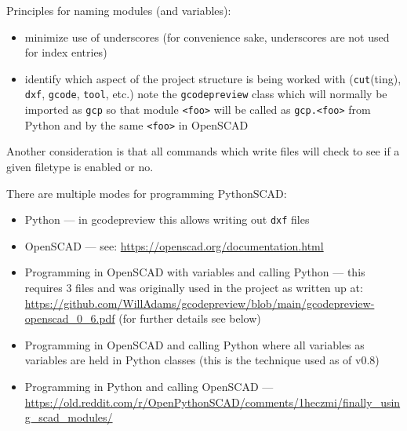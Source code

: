 \documentclass{ltxdoc}
\begin{document}
Principles for naming modules (and variables):

\begin{itemize}
\item minimize use of underscores (for convenience sake, underscores are not used for index entries)
\item identify which aspect of the project structure is being worked with (\texttt{cut}(ting), 
      \texttt{dxf}, \texttt{gcode}, \texttt{tool}, etc.) note the \verb|gcodepreview| class which will 
      normally be imported as \verb|gcp| so that module \verb|<foo>| will be called as
      \verb|gcp.<foo>| from Python and by the same \verb|<foo>| in OpenSCAD
\end{itemize}


\addvspace{\baselineskip}


Another consideration is that all commands which write files will check to see if a given filetype is enabled or no.

There are multiple modes for programming PythonSCAD:

\begin{itemize}
\item Python --- in gcodepreview this allows writing out \verb|dxf| files
\item OpenSCAD --- see: \url{https://openscad.org/documentation.html}
\item Programming in OpenSCAD with variables and calling Python --- this requires 3 files and was originally used in the project as written up at: \url{https://github.com/WillAdams/gcodepreview/blob/main/gcodepreview-openscad_0_6.pdf} (for further details see below)
\item Programming in OpenSCAD and calling Python where all variables as variables are held in Python classes (this is the technique used as of v0.8)
\item Programming in Python and calling OpenSCAD --- \url{https://old.reddit.com/r/OpenPythonSCAD/comments/1heczmi/finally_using_scad_modules/}
\end{itemize}
\end{document}
